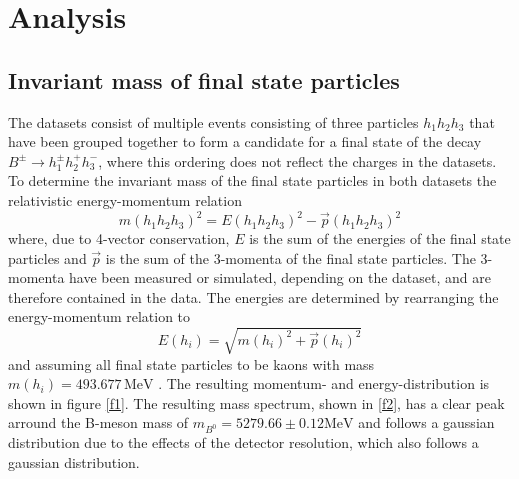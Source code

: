 \section{Analysis}\label{sec:analysis}

\subsection{Invariant mass of final state particles}
The datasets consist of multiple events consisting of three particles $h_1 h_2 h_3$ that have been grouped together to form a candidate for a final state
of the decay $B^\pm \rightarrow h_1^\pm h_2^+ h_3^-$, where this ordering does not reflect the charges in the datasets.
To determine the invariant mass of the final state particles in both datasets the relativistic energy-momentum relation
\begin{equation}
  m(h_1 h_2 h_3)^2 = E(h_1 h_2 h_3)^2 - \vec{p}(h_1 h_2 h_3)^2
\end{equation}
where, due to 4-vector conservation, $E$ is the sum of the energies of the final state particles and $\vec{p}$ is the sum of the 3-momenta of the
final state particles. The 3-momenta have been measured or simulated, depending on the dataset, and are therefore contained in the data.
The energies are determined by rearranging the energy-momentum relation to
\begin{equation}
  E(h_i) = \sqrt{m(h_i)^2 + \vec{p}(h_i)^2}
\end{equation}
and assuming all final state particles to be kaons with mass $m(h_i) = 493.677 \, \si{\mega\eV}$ \cite{pdg}. The resulting momentum- and energy-distribution 
is shown in figure \ref{f1}. The resulting mass spectrum, shown in \ref{f2}, has a clear peak arround the B-meson mass of 
$m_{B^0} = 5279.66 \pm 0.12 \si{\mega\eV}$ \cite{pdg} and follows a gaussian distribution due to the effects of the detector resolution, which 
also follows a gaussian distribution. 


